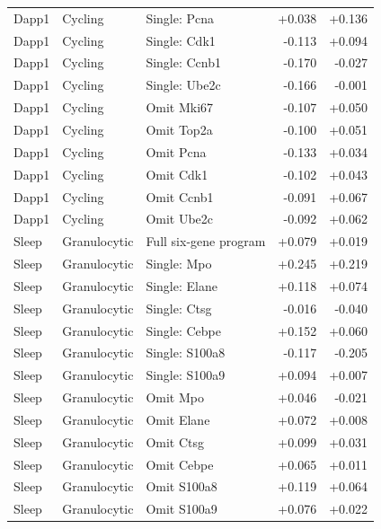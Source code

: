 \begin{longtable}{@{}llp{5.4cm}rr@{}}
Dapp1 & Cycling & Single: Pcna & +0.038 & +0.136\\
Dapp1 & Cycling & Single: Cdk1 & -0.113 & +0.094\\
Dapp1 & Cycling & Single: Ccnb1 & -0.170 & -0.027\\
Dapp1 & Cycling & Single: Ube2c & -0.166 & -0.001\\
Dapp1 & Cycling & Omit Mki67 & -0.107 & +0.050\\
Dapp1 & Cycling & Omit Top2a & -0.100 & +0.051\\
Dapp1 & Cycling & Omit Pcna & -0.133 & +0.034\\
Dapp1 & Cycling & Omit Cdk1 & -0.102 & +0.043\\
Dapp1 & Cycling & Omit Ccnb1 & -0.091 & +0.067\\
Dapp1 & Cycling & Omit Ube2c & -0.092 & +0.062\\
\addlinespace[4pt]
Sleep & Granulocytic & Full six-gene program & +0.079 & +0.019\\
Sleep & Granulocytic & Single: Mpo & +0.245 & +0.219\\
Sleep & Granulocytic & Single: Elane & +0.118 & +0.074\\
Sleep & Granulocytic & Single: Ctsg & -0.016 & -0.040\\
Sleep & Granulocytic & Single: Cebpe & +0.152 & +0.060\\
Sleep & Granulocytic & Single: S100a8 & -0.117 & -0.205\\
Sleep & Granulocytic & Single: S100a9 & +0.094 & +0.007\\
Sleep & Granulocytic & Omit Mpo & +0.046 & -0.021\\
Sleep & Granulocytic & Omit Elane & +0.072 & +0.008\\
Sleep & Granulocytic & Omit Ctsg & +0.099 & +0.031\\
Sleep & Granulocytic & Omit Cebpe & +0.065 & +0.011\\
Sleep & Granulocytic & Omit S100a8 & +0.119 & +0.064\\
Sleep & Granulocytic & Omit S100a9 & +0.076 & +0.022\\
\end{longtable}
\normalsize
